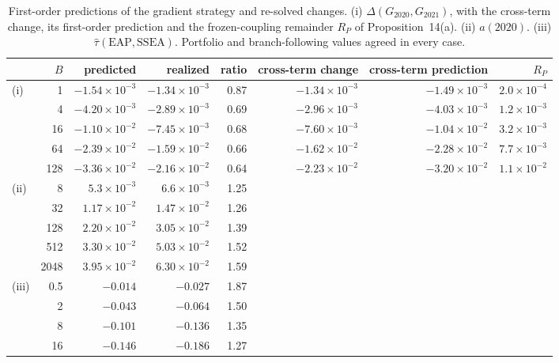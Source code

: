 \documentclass[12pt]{article}
\begin{document}
\begin{table}[h]
\caption{First-order predictions of the gradient strategy and re-solved changes. (i) $\Delta(G_{2020},G_{2021})$, with the cross-term change, its first-order prediction and the frozen-coupling remainder $R_P$ of Proposition~14(a). (ii) $a(2020)$. (iii) $\hat\tau(\mathrm{EAP},\mathrm{SSEA})$. Portfolio and branch-following values agreed in every case.}\label{tab:sensacc}
\centering\footnotesize
\begin{tabular}{lrrrrrrr}
\toprule
 & $B$ & predicted & realized & ratio & cross-term change & cross-term prediction & $R_P$\\
\midrule
(i) & 1 & $-1.54\times10^{-3}$ & $-1.34\times10^{-3}$ & 0.87 & $-1.34\times10^{-3}$ & $-1.49\times10^{-3}$ & $2.0\times10^{-4}$\\
 & 4 & $-4.20\times10^{-3}$ & $-2.89\times10^{-3}$ & 0.69 & $-2.96\times10^{-3}$ & $-4.03\times10^{-3}$ & $1.2\times10^{-3}$\\
 & 16 & $-1.10\times10^{-2}$ & $-7.45\times10^{-3}$ & 0.68 & $-7.60\times10^{-3}$ & $-1.04\times10^{-2}$ & $3.2\times10^{-3}$\\
 & 64 & $-2.39\times10^{-2}$ & $-1.59\times10^{-2}$ & 0.66 & $-1.62\times10^{-2}$ & $-2.28\times10^{-2}$ & $7.7\times10^{-3}$\\
 & 128 & $-3.36\times10^{-2}$ & $-2.16\times10^{-2}$ & 0.64 & $-2.23\times10^{-2}$ & $-3.20\times10^{-2}$ & $1.1\times10^{-2}$\\
\addlinespace
(ii) & 8 & $5.3\times10^{-3}$ & $6.6\times10^{-3}$ & 1.25 & & & \\
 & 32 & $1.17\times10^{-2}$ & $1.47\times10^{-2}$ & 1.26 & & & \\
 & 128 & $2.20\times10^{-2}$ & $3.05\times10^{-2}$ & 1.39 & & & \\
 & 512 & $3.30\times10^{-2}$ & $5.03\times10^{-2}$ & 1.52 & & & \\
 & 2048 & $3.95\times10^{-2}$ & $6.30\times10^{-2}$ & 1.59 & & & \\
\addlinespace
(iii) & 0.5 & $-0.014$ & $-0.027$ & 1.87 & & & \\
 & 2 & $-0.043$ & $-0.064$ & 1.50 & & & \\
 & 8 & $-0.101$ & $-0.136$ & 1.35 & & & \\
 & 16 & $-0.146$ & $-0.186$ & 1.27 & & & \\
\bottomrule
\end{tabular}
\end{table}
\end{document}
